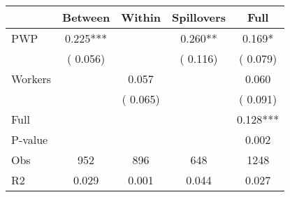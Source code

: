 
\begin{tabular}{l*{4}{c}}\hline&\multicolumn{1}{c}{Between}&\multicolumn{1}{c}{Within}&\multicolumn{1}{c}{Spillovers}&\multicolumn{1}{c}{Full}\\ \hline
 PWP           &              0.225***      &                                               &        0.260** &         0.169*                            \\ 
                               &        (       0.056)           &                                       &       (       0.116)     &      (       0.079)                                           \\ 
 Workers       &                                               &        0.057    &                                &             0.060                            \\ 
                               &                                               & (       0.065)                  &                                        &      (       0.091)                                           \\ 
\hline                                                                                                                                                                                                                                            
 Full                  &                                               &                                               &                                        &             0.128***                                     \\ 
 P-value               &                                               &                                               &                                        &             0.002                                           \\ 
 Obs                   &               952               &       896                       &       648                &              1248                                               \\ 
 R2                    &                      0.029              &              0.001                      &              0.044               &                     0.027                                              \\ 
\hline \end{tabular}                                                                                                                                                                                                              